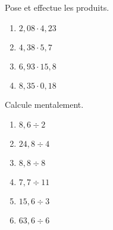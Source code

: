 \begin{exercice}
Pose et effectue les produits.
\begin{enumerate} 
 \item $2,08 \cdot 4,23$ \dotfill \hspace*{11em}
 
 \item $4,38 \cdot 5,7$ \dotfill \hspace*{11em}
 
 \item $6,93 \cdot 15,8$ \dotfill \hspace*{11em}
 
 \item $8,35 \cdot 0,18 $\dotfill \hspace*{11em} 
 
 \end{enumerate}
\end{exercice}


\begin{exercice} 
Calcule mentalement.
\begin{enumerate} 
 \item $ 8,6 \div 2$ \dotfill \hspace*{11em}
 
 \item $ 24,8 \div 4$\dotfill \hspace*{11em}
 
 \item $ 8,8 \div 8$\dotfill \hspace*{11em}
 
 \item $ 7,7 \div 11$\dotfill \hspace*{11em}
 
 \item $ 15,6 \div 3$ \dotfill \hspace*{11em}
 
 \item $ 63,6 \div 6$ \dotfill \hspace*{11em}
 
 \end{enumerate}
\end{exercice}


